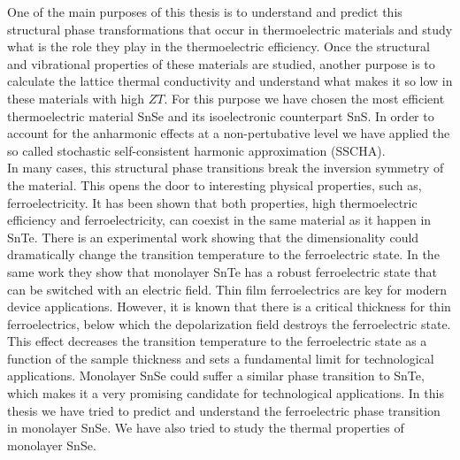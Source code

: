 One of the main purposes of this thesis is to understand and predict this structural phase transformations that occur 
in thermoelectric materials and study what is the role they play in the thermoelectric efficiency. Once the 
structural and vibrational properties of these materials are studied, another purpose is to calculate the lattice 
thermal conductivity and understand what makes it so low in these materials with high $ZT$. For this purpose we have 
chosen the most efficient thermoelectric material SnSe and its isoelectronic counterpart SnS. In order to account 
for the anharmonic effects at a non-pertubative level we have applied the so called stochastic self-consistent 
harmonic approximation\cite{errea2013first,errea2014anharmonic,bianco2017second,monacelli2018pressure} (SSCHA). \\

In many cases, this structural phase transitions break the inversion symmetry of the 
material\cite{ribeiro2018strong,chang2016discovery}. This opens the door to interesting physical properties, such 
as, ferroelectricity. It has been shown that both properties, high thermoelectric efficiency and ferroelectricity, 
can coexist in the same material as it happen in SnTe\cite{ribeiro2018strong,zhang2013high}. There is an 
experimental work\cite{chang2016discovery} showing that the dimensionality could dramatically change the transition 
temperature to the ferroelectric state. In the same work\cite{chang2016discovery} they show that 
monolayer SnTe has a robust ferroelectric state that can be switched with an electric field. Thin film ferroelectrics 
are key for modern device applications\cite{lallart2011ferroelectrics}. However, it is known that there is a critical 
thickness for thin ferroelectrics, below which the depolarization field destroys the ferroelectric 
state\cite{batra1973new,zhong1994giant,dawber2005physics}. This effect decreases the transition temperature to the 
ferroelectric state as a function of the sample thickness\cite{fong2004ferroelectricity,fong2006stabilization} and 
sets a fundamental limit for technological applications. Monolayer SnSe could suffer a similar phase transition to 
SnTe, which makes it a very promising candidate for technological applications. In this thesis we have tried to 
predict and understand the ferroelectric phase transition in monolayer SnSe\cite{chang2020controlled}. We have also 
tried to study the thermal properties of monolayer SnSe. \\

